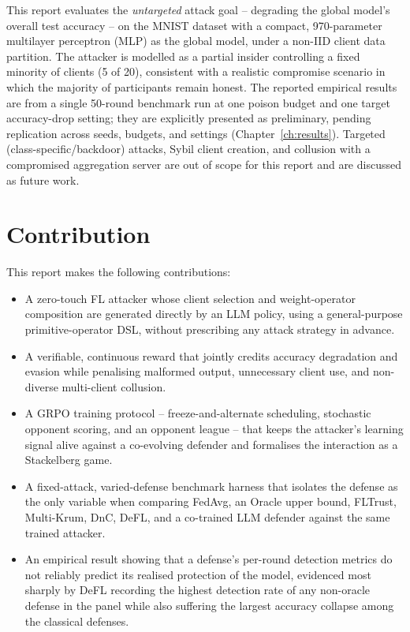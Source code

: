 This report evaluates the \emph{untargeted} attack goal -- degrading the global model's overall test accuracy -- on the MNIST dataset with a compact, 970-parameter multilayer perceptron (MLP) as the global model, under a non-IID client data partition. The attacker is modelled as a partial insider controlling a fixed minority of clients (5 of 20), consistent with a realistic compromise scenario in which the majority of participants remain honest. The reported empirical results are from a single 50-round benchmark run at one poison budget and one target accuracy-drop setting; they are explicitly presented as preliminary, pending replication across seeds, budgets, and settings (Chapter~\ref{ch:results}). Targeted (class-specific/backdoor) attacks, Sybil client creation, and collusion with a compromised aggregation server are out of scope for this report and are discussed as future work.

\section{Contribution}
\label{sec:intro-contribution}

This report makes the following contributions:
\begin{itemize}
    \item A zero-touch FL attacker whose client selection and weight-operator composition are generated directly by an LLM policy, using a general-purpose primitive-operator DSL, without prescribing any attack strategy in advance.
    \item A verifiable, continuous reward that jointly credits accuracy degradation and evasion while penalising malformed output, unnecessary client use, and non-diverse multi-client collusion.
    \item A GRPO training protocol -- freeze-and-alternate scheduling, stochastic opponent scoring, and an opponent league -- that keeps the attacker's learning signal alive against a co-evolving defender and formalises the interaction as a Stackelberg game.
    \item A fixed-attack, varied-defense benchmark harness that isolates the defense as the only variable when comparing FedAvg, an Oracle upper bound, FLTrust, Multi-Krum, DnC, DeFL, and a co-trained LLM defender against the same trained attacker.
    \item An empirical result showing that a defense's per-round detection metrics do not reliably predict its realised protection of the model, evidenced most sharply by DeFL recording the highest detection rate of any non-oracle defense in the panel while also suffering the largest accuracy collapse among the classical defenses.
\end{itemize}

